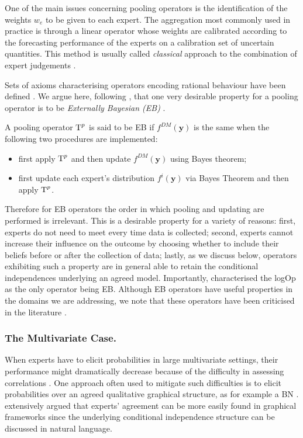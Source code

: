 One of the main issues concerning pooling operators is the identification of the weights $w_e$ to be given to each expert. The aggregation most commonly used in practice is through a linear operator whose weights are calibrated according to the forecasting performance of the experts on a calibration set of uncertain quantities. This method is usually called \textit{classical} approach to the combination of expert judgements \citep{Cooke1991a}.

Sets of axioms characterising operators encoding rational behaviour have been defined \citep[see for a review][]{Genest86}.  We argue here, following \citet{Faria1997}, that one very desirable property for a pooling operator is to be \textit{Externally Bayesian (EB)} \citep{Madansky64}. 
\begin{definition}
A pooling operator $\textnormal{T}^p$ is said to be EB if  $f^{DM}(\bm{y})$ is the same when the following two procedures are implemented:
\begin{itemize}
\item first apply $\textnormal{T}^p$ and then update $f^{DM}(\bm{y})$ using Bayes theorem;
\item first update each expert's distribution $f^i(\bm{y})$ via Bayes Theorem and then apply $\textnormal{T}^p$. 
\end{itemize}
\end{definition} 
Therefore for EB operators the order in which pooling and updating are performed is irrelevant. This is a desirable property for a variety of reasons: first, experts do not need to meet every time data is collected; second, experts cannot increase their influence on the outcome by choosing whether to include their beliefs before or after the collection of data; lastly, as we discuss below, operators exhibiting such a property are in general  able to retain the conditional independences underlying an agreed model.  Importantly, \citet{Genest84} characterised the logOp as the only operator being EB.
Although EB operators have useful properties in the domains we are addressing, we note that these operators have been criticised in the literature \citep[see e.g.][]{Lindley1985}.

\subsubsection{The Multivariate Case.}
When experts have to elicit probabilities in large multivariate settings, their performance might dramatically decrease because of the difficulty in assessing correlations \citep{Clemen2000,Winkler2004}. One approach often used to mitigate such difficulties is to elicit probabilities over an agreed qualitative graphical structure, as for example a BN \citep{Burns1993, Faria1997, Farr2015, Renooij2001,Smith2000}. \citet{Smith1996a} extensively argued that experts' agreement can be more easily found in graphical frameworks since the underlying conditional independence structure can be discussed in natural language.

